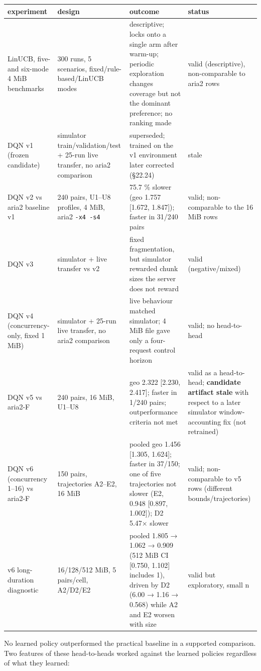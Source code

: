 \documentclass[10pt,a4paper]{article}
\begin{document}
{\small\begin{tabularx}{\linewidth}{@{}LLLL@{}}
\toprule
\textbf{experiment} & \textbf{design} & \textbf{outcome} & \textbf{status}\\
\midrule
LinUCB, five- and six-mode 4 MiB benchmarks & 300 runs, 5 scenarios, fixed/rule-based/LinUCB modes & descriptive; locks onto a single arm after warm-up; periodic exploration changes coverage but not the dominant preference; no ranking made & valid (descriptive), non-comparable to aria2 rows\\
DQN v1 (frozen candidate) & simulator train/validation/test + 25-run live transfer, no aria2 comparison & superseded; trained on the v1 environment later corrected (§22.24) & stale\\
DQN v2 vs aria2 baseline v1 & 240 pairs, U1–U8 profiles, 4 MiB, aria2 \texttt{-x4 -s4} & 75.7 \% slower (geo 1.757 [1.672, 1.847]); faster in 31/240 pairs & valid; non-comparable to the 16 MiB rows\\
DQN v3 & simulator + live transfer vs v2 & fixed fragmentation, but simulator rewarded chunk sizes the server does not reward & valid (negative/mixed)\\
DQN v4 (concurrency-only, fixed 1 MiB) & simulator + 25-run live transfer, no aria2 comparison & live behaviour matched simulator; 4 MiB file gave only a four-request control horizon & valid; no head-to-head\\
DQN v5 vs aria2-F & 240 pairs, 16 MiB, U1–U8 & geo 2.322 [2.230, 2.417]; faster in 1/240 pairs; outperformance criteria not met & valid as a head-to-head; \textbf{candidate artifact stale} with respect to a later simulator window-accounting fix (not retrained)\\
DQN v6 (concurrency 1–16) vs aria2-F & 150 pairs, trajectories A2–E2, 16 MiB & pooled geo 1.456 [1.305, 1.624]; faster in 37/150; one of five trajectories not slower (E2, 0.948 [0.897, 1.002]); D2 5.47× slower & valid; non-comparable to v5 rows (different bounds/trajectories)\\
v6 long-duration diagnostic & 16/128/512 MiB, 5 pairs/cell, A2/D2/E2 & pooled 1.805 → 1.062 → 0.909 (512 MiB CI [0.750, 1.102] includes 1), driven by D2 (6.00 → 1.16 → 0.568) while A2 and E2 worsen with size & valid but exploratory, small n\\
\bottomrule
\end{tabularx}}


No learned policy outperformed the practical baseline in a supported comparison. Two features of these head-to-heads worked against the learned policies regardless of what they learned:
\end{document}
